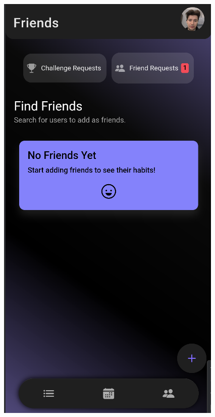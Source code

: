 \documentclass[12pt]{report}
\begin{document}
\begin{figure}[H]
    \begin{minipage}[t]{0.25\textwidth}
        \centering
        \includegraphics[width=\linewidth]{src/friendrequest3.png}
    \end{minipage}

    \vspace{0.8em}


\end{figure}
\end{document}
